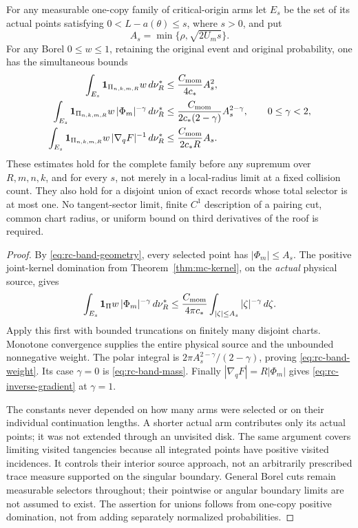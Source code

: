 \begin{theorem}
\label{thm:rc-band}
For any measurable one-copy family of critical-origin arms let
$E_s$ be the set of its actual points satisfying
$0<L-a(\theta)\le s$, where $s>0$, and put
\[
 A_s=\min\{\rho,\sqrt{2U_m s}\}.
\]
For any Borel $0\le w\le1$, retaining the original event and original
probability, one has the simultaneous bounds
\begin{align}
 \int_{E_s}\mathbf1_{\Pi_{n,k,m,R}}w\,d\nu_R^*
   &\le\frac{C_{\rm mom}}{4c_*}A_s^2,
                                      \label{eq:rc-band-mass}\\
 \int_{E_s}\mathbf1_{\Pi_{n,k,m,R}}w\,|\Phi_m|^{-\gamma}\,d\nu_R^*
   &\le\frac{C_{\rm mom}}{2c_*(2-\gamma)}A_s^{2-\gamma},
     \qquad 0\le\gamma<2,             \label{eq:rc-band-weight}\\
 \int_{E_s}\mathbf1_{\Pi_{n,k,m,R}}w\,|\nabla_qF|^{-1}\,d\nu_R^*
   &\le\frac{C_{\rm mom}}{2c_*R}A_s.
                                      \label{eq:rc-inverse-gradient}
\end{align}
These estimates hold for the complete family before any supremum over
$R,m,n,k$, and for every $s$, not merely in a local-radius limit at a
fixed collision count. They also hold for a disjoint union of exact
records whose total selector is at most one. No tangent-sector limit,
finite $C^1$ description of a pairing cut, common chart radius, or
uniform bound on third derivatives of the roof is required.
\end{theorem}
\begin{proof}
By \eqref{eq:rc-band-geometry}, every selected point has
$|\Phi_m|\le A_s$. The positive joint-kernel domination from
Theorem~\ref{thm:mc-kernel}, on the \emph{actual} physical source, gives
\[
 \int_{E_s}\mathbf1_\Pi w\,|\Phi_m|^{-\gamma}\,d\nu_R^*
 \le\frac{C_{\rm mom}}{4\pi c_*}
       \int_{|\zeta|\le A_s}|\zeta|^{-\gamma}\,d\zeta.
\]
Apply this first with bounded truncations on finitely many disjoint
charts. Monotone convergence supplies the entire physical source and
the unbounded nonnegative weight. The polar integral is
$2\pi A_s^{2-\gamma}/(2-\gamma)$, proving
\eqref{eq:rc-band-weight}. Its case $\gamma=0$ is
\eqref{eq:rc-band-mass}. Finally $|\nabla_qF|=R|\Phi_m|$ gives
\eqref{eq:rc-inverse-gradient} at $\gamma=1$.

The constants never depended on how many arms were selected or on
their individual continuation lengths. A shorter actual arm contributes
only its actual points; it was not extended through an unvisited disk.
The same argument covers limiting visited tangencies because all
integrated points have positive visited incidences. It controls their
interior source approach, not an arbitrarily prescribed trace measure
supported on the singular boundary. General Borel cuts remain measurable
selectors throughout; their pointwise or angular boundary limits are
not assumed to exist. The assertion for unions follows from one-copy
positive domination, not from adding separately normalized probabilities.
\end{proof}

